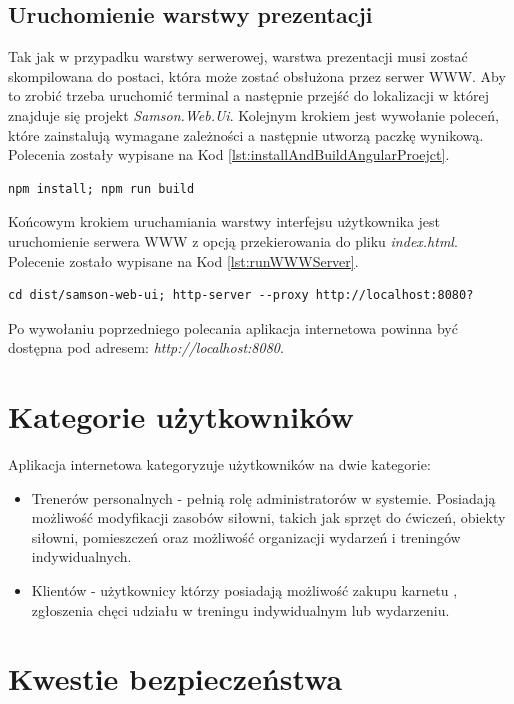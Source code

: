 \documentclass[a4paper,twoside,12pt]{book}
\begin{document}
\subsection{Uruchomienie warstwy prezentacji}
Tak jak w przypadku warstwy serwerowej, warstwa prezentacji musi zostać skompilowana do postaci, która może zostać obsłużona przez serwer WWW. Aby to zrobić trzeba uruchomić terminal a następnie przejść do lokalizacji w której znajduje się projekt \textit{Samson.Web.Ui}. Kolejnym krokiem jest wywołanie poleceń, które zainstalują wymagane zależności a następnie utworzą paczkę wynikową. Polecenia zostały wypisane na Kod \ref{lst:installAndBuildAngularProejct}.
\begin{lstlisting}[caption={Polecenie, które tworzy paczkę możliwą do uruchomienia przez serwer WWW}, label={lst:installAndBuildAngularProejct}]
	npm install; npm run build
\end{lstlisting}

Końcowym krokiem uruchamiania warstwy interfejsu użytkownika jest uruchomienie serwera WWW z opcją przekierowania do pliku \textit{index.html}. Polecenie zostało wypisane na Kod \ref{lst:runWWWServer}.
\begin{lstlisting}[caption={Polecenie, które tworzy paczkę możliwą do uruchomienia przez serwer WWW}, label={lst:runWWWServer}]
	cd dist/samson-web-ui; http-server --proxy http://localhost:8080?
\end{lstlisting}

Po wywołaniu poprzedniego polecania aplikacja internetowa powinna być dostępna pod adresem: \textit{http://localhost:8080}.

\section {Kategorie użytkowników}

Aplikacja internetowa kategoryzuje użytkowników na dwie kategorie:
\begin{itemize}
	\item Trenerów personalnych - pełnią rolę administratorów w systemie. Posiadają możliwość modyfikacji zasobów siłowni, takich jak sprzęt do ćwiczeń, obiekty siłowni, pomieszczeń oraz możliwość organizacji wydarzeń i treningów indywidualnych.
	\item Klientów - użytkownicy którzy posiadają możliwość zakupu karnetu , zgłoszenia chęci udziału w treningu indywidualnym lub wydarzeniu.
\end{itemize}

\section {Kwestie bezpieczeństwa}
\end{document}
